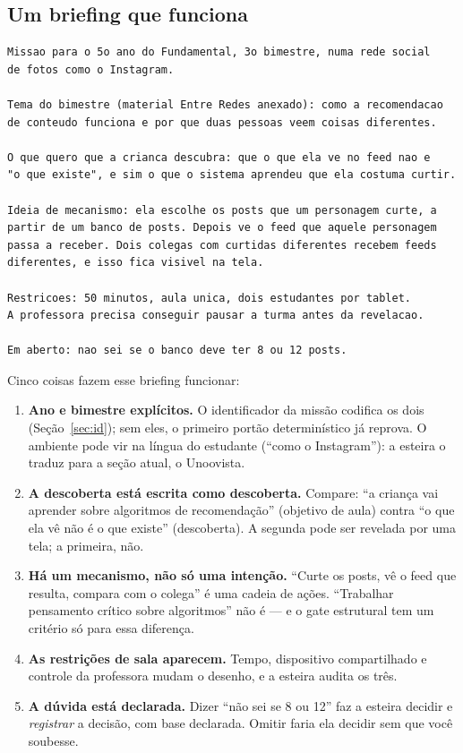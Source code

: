 \documentclass[11pt,a4paper]{article}
\begin{document}
\subsection{Um briefing que funciona}

\begin{lstlisting}
Missao para o 5o ano do Fundamental, 3o bimestre, numa rede social
de fotos como o Instagram.

Tema do bimestre (material Entre Redes anexado): como a recomendacao
de conteudo funciona e por que duas pessoas veem coisas diferentes.

O que quero que a crianca descubra: que o que ela ve no feed nao e
"o que existe", e sim o que o sistema aprendeu que ela costuma curtir.

Ideia de mecanismo: ela escolhe os posts que um personagem curte, a
partir de um banco de posts. Depois ve o feed que aquele personagem
passa a receber. Dois colegas com curtidas diferentes recebem feeds
diferentes, e isso fica visivel na tela.

Restricoes: 50 minutos, aula unica, dois estudantes por tablet.
A professora precisa conseguir pausar a turma antes da revelacao.

Em aberto: nao sei se o banco deve ter 8 ou 12 posts.
\end{lstlisting}

Cinco coisas fazem esse briefing funcionar:

\begin{enumerate}
  \item \textbf{Ano e bimestre explícitos.} O identificador da missão codifica os dois (Seção~\ref{sec:id}); sem eles, o primeiro portão determinístico já reprova. O ambiente pode vir na língua do estudante (``como o Instagram''): a esteira o traduz para a seção atual, o Unoovista.
  \item \textbf{A descoberta está escrita como descoberta.} Compare: ``a criança vai aprender sobre algoritmos de recomendação'' (objetivo de aula) contra ``o que ela vê não é o que existe'' (descoberta). A segunda pode ser revelada por uma tela; a primeira, não.
  \item \textbf{Há um mecanismo, não só uma intenção.} ``Curte os posts, vê o feed que resulta, compara com o colega'' é uma cadeia de ações. ``Trabalhar pensamento crítico sobre algoritmos'' não é --- e o gate estrutural tem um critério só para essa diferença.
  \item \textbf{As restrições de sala aparecem.} Tempo, dispositivo compartilhado e controle da professora mudam o desenho, e a esteira audita os três.
  \item \textbf{A dúvida está declarada.} Dizer ``não sei se 8 ou 12'' faz a esteira decidir e \emph{registrar} a decisão, com base declarada. Omitir faria ela decidir sem que você soubesse.
\end{enumerate}
\end{document}
